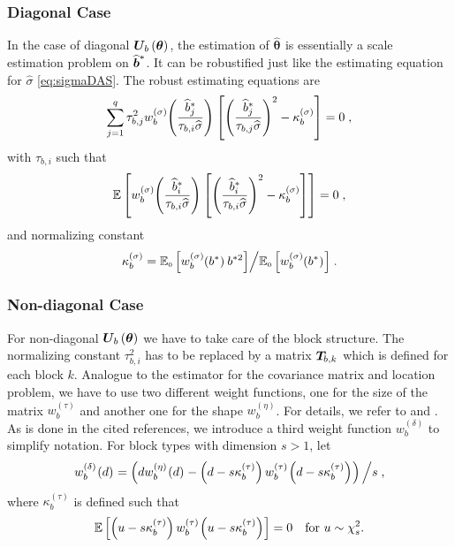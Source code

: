 \documentclass[11pt, a4paper]{article}
\renewcommand{\widetilde}{\widehat}
\newcommand{\fn}[1]{\kern-1pt\left(#1\right)\kern+0.5pt}
\newcommand{\bld}[1]{\boldsymbol{#1}}
\renewcommand{\vec}[1]{\bld{#1}}
\newcommand{\tv}[2][]{{\widetilde{\vec{#2}}_{#1}}}
\newcommand{\s}[1][\rho]{#1^{(\sigma)}}
\newcommand{\si}[2][w]{#1^{(\sigma)}_{#2}\kern-1pt}
\newcommand{\tvbs}{\widetilde{\vec{b}}^{\raisebox{-0.75ex}{\scriptsize *}}}
\newcommand{\bs}{b^{*}}
\newcommand{\bsQ}{b^{*2}}
\newcommand{\hbs}{\widehat{b}^{*}}
\newcommand{\U}[2][-0.15ex]{\bld{U}_{\hspace{#1}#2\hspace{0.25ex}}}
\newcommand{\Ubth}{\U{b}\fn{\vec\theta}}
\newcommand{\w}[2][b]{w_{#1}^{(#2)}}
\newcommand{\kbtau}{\kappa_b^{(\tau)}}
\newcommand{\ERWSymbol}{\mathbb{E}}
\newcommand{\makeright}[2]{\ifx#1\left\right#2\else#1#2\fi}
\newcommand{\Xsub}[2]{{#1}_{\mathrm{\scriptscriptstyle #2}}}
\newcommand{\ERW}[2][\left] {\ERWSymbol    #1[ #2 \makeright{#1}{]}}
\newcommand{\ERWi}[3][\left] {\Xsub{\ERWSymbol}{#2}    #1[ #3
    \makeright{#1}{]}}
\newcommand{\Tbk}{\bld{T}_{\hspace{-0.5ex}b,k\hspace{0.25ex}}}
\theoremstyle{note}
\begin{document}
\subsubsection{Diagonal Case}
In the case of diagonal $\Ubth$, the estimation of $\tv\theta$ is
essentially a scale estimation problem on $\tvbs$. It can be robustified
just like the estimating equation for $\hat\sigma$ \eqref{eq:sigmaDAS}. The
robust estimating equations are
\begin{equation}
  \label{eq:thetaDAS}
  \sum_{j=1}^q\tau_{b,j}^2\si{b}\fn{\frac{\hbs_j}{\tau_{b,i}\widehat\sigma}}
  \left[
    \left(\frac{\hbs_j}{\tau_{b,j}\widehat\sigma}\right)^2 - \s[\kappa]_b
  \right] = 0\;,
\end{equation}
with $\tau_{b,i}$ such that
\begin{equation*}
  \ERW{\si{b}\fn{\frac{\hbs_i}{\tau_{b,i}\widehat\sigma}}
    \left[\left(\frac{\hbs_i}{\tau_{b,i}\widehat\sigma}\right)^2 -
    \s[\kappa]_b\right]} = 0\;,
\end{equation*}
and normalizing constant
\begin{equation*}
  \s[\kappa]_b = {\ERWi{0}{\si{b}\fn{\bs}\bsQ}}\Big/
  {\ERWi{0}{\si{b}\fn{\bs}}}\;.
\end{equation*}

\subsubsection{Non-diagonal Case}
For non-diagonal $\Ubth$ we have to take care of the block structure. The
normalizing constant $\tau_{b,i}^2$ has to be replaced by a matrix $\Tbk$
which is defined for each block $k$. Analogue to the estimator for the
covariance matrix and location problem, we have to use two different weight
functions, one for the size of the matrix $\w{\tau}$ and another one for
the shape $\w{\eta}$. For details, we refer to \citet{stahel1987estimation}
and \citet[Chapter~5]{HamFRRS86}. As is done in the cited references, we
introduce a third weight function $\w{\delta}$ to simplify notation. For
block types with dimension $s > 1$, let
\begin{equation*}
  \w{\delta}\fn{d} = \left(d\w{\eta}\fn{d} -
    \left(d-s\kbtau\right)\w{\tau}\fn{d-s\kbtau}\right)\Big/s\;,
\end{equation*}
where $\kbtau$ is defined such that
\begin{equation*}
  \ERW{\left(u - s\kbtau\right)\w{\tau}\fn{u - s\kbtau}} = 0 \quad
  \mbox{for }u\sim\chi^2_s.
\end{equation*}
\end{document}

